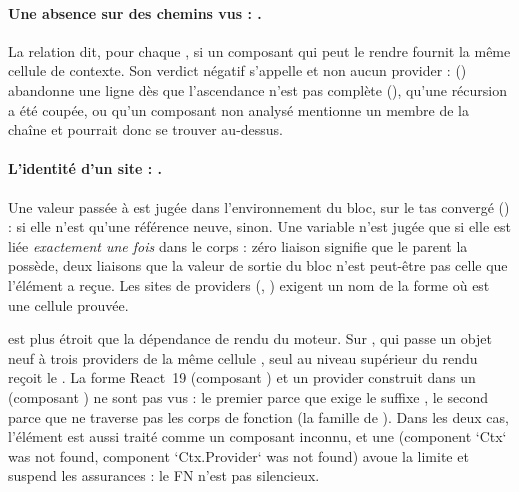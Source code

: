 \paragraph{Une absence sur des chemins vus : .} La relation  dit, pour chaque , si un composant qui peut le rendre fournit la même cellule de contexte. Son verdict négatif s'appelle  et non \og aucun provider\fg{} :  () abandonne une ligne dès que l'ascendance n'est pas complète (), qu'une récursion a été coupée, ou qu'un composant non analysé mentionne un membre de la chaîne et pourrait donc se trouver au-dessus.

\paragraph{L'identité d'un site : .} Une valeur passée à  est jugée dans l'environnement du bloc, sur le tas convergé () :  si elle n'est qu'une référence neuve,  sinon. Une variable n'est jugée que si elle est liée \emph{exactement une fois} dans le corps : zéro liaison signifie que le parent la possède, deux liaisons que la valeur de sortie du bloc n'est peut-être pas celle que l'élément a reçue. Les sites de providers (, ) exigent un nom de la forme  où  est une cellule  prouvée.

\begin{piege}
 est plus étroit que la dépendance de rendu du moteur. Sur , qui passe un objet neuf à trois providers de la même cellule , seul  au niveau supérieur du rendu reçoit le \Warning{} . La forme React~19  (composant ) et un provider construit dans un  (composant ) ne sont pas vus : le premier parce que  exige le suffixe , le second parce que  ne traverse pas les corps de fonction (la famille de ). Dans les deux cas, l'élément est aussi traité comme un composant inconnu, et une \Info{}  (\og component `Ctx` was not found\fg, \og component `Ctx.Provider` was not found\fg) avoue la limite et suspend les assurances : le FN n'est pas silencieux.
\end{piege}

